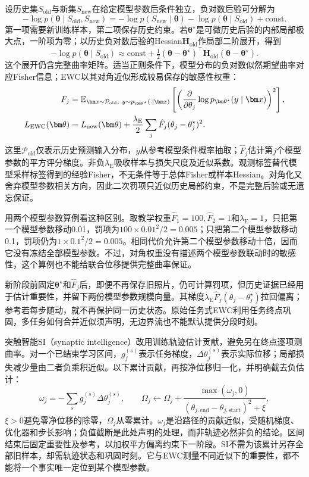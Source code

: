 设历史集$S_{\mathrm{old}}$与新集$S_{\mathrm{new}}$在给定模型参数后条件独立，负对数后验可分解为
\[
-\log p(\bm\theta\mid S_{\mathrm{old}},S_{\mathrm{new}})
=-\log p(S_{\mathrm{new}}\mid\bm\theta)
-\log p(\bm\theta\mid S_{\mathrm{old}})+\mathrm{const}.
\]
第一项需要新训练样本，第二项保存历史约束。若$\bm\theta^\star$是可微历史后验的内部局部极大点，一阶项为零；以历史负对数后验的Hessian$\bm H_{\mathrm{old}}$作局部二阶展开，得到
\[
-\log p(\bm\theta\mid S_{\mathrm{old}})
\approx\mathrm{const}
+\tfrac12(\bm\theta-\bm\theta^\star)^\top
\bm H_{\mathrm{old}}(\bm\theta-\bm\theta^\star).
\]
这个展开仍含完整曲率矩阵。适当正则条件下，模型分布的负对数似然期望曲率对应Fisher信息；EWC以其对角近似形成较易保存的敏感性权重：
\begin{align}
F_j&=\mathbb E_{\bm x\sim\mathcal P_{\mathrm{old}},\
y\sim p_{\bm\theta^\star}(\cdot\mid\bm x)}
\left[
\left(\frac{\partial}{\partial\theta_j}
\log p_{\bm\theta^\star}(y\mid\bm x)\right)^2
\right],\notag\\
L_{\mathrm{EWC}}(\bm\theta)
&=L_{\mathrm{new}}(\bm\theta)
+\frac{\lambda_{\mathrm E}}2
\sum_j\hat F_j(\theta_j-\theta_j^\star)^2.
\label{eq:ket-update-ewc}
\end{align}
这里$\mathcal P_{\mathrm{old}}$仅表示历史预测输入分布，$y$从参考模型条件概率抽取；$\hat F_j$估计第$j$个模型参数的平方评分梯度。非负$\lambda_{\mathrm E}$吸收样本与损失尺度及近似系数。观测标签替代模型采样标签得到的经验Fisher，不无条件等于总体Fisher或样本Hessian。对角化又舍弃模型参数相关方向，因此二次罚项只近似历史局部约束，不是完整后验或无遗忘保证。

用两个模型参数算例看这种区别。取教学权重$\hat F_1=100,\hat F_2=1$和$\lambda_{\mathrm E}=1$，只把第一个模型参数移动0.01，罚项为$100\times0.01^2/2=0.005$；只把第二个模型参数移动0.1，罚项仍为$1\times0.1^2/2=0.005$。相同代价允许第二个模型参数移动十倍，因而它没有冻结全部模型参数。不过，对角权重没有描述两个模型参数联动时的敏感性，这个算例也不能给联合位移提供完整曲率保证。

新阶段前固定$\bm\theta^\star$和$\hat F_j$后，即便不再保存旧照片，仍可计算罚项，但历史证据已经用于估计重要性，并留下两份模型参数规模向量。其梯度$\lambda_{\mathrm E}\hat F_j(\theta_j-\theta_j^\star)$拉回偏离；参考若每步随动，就不再保护同一历史状态。原始任务式EWC利用任务终点巩固，多任务如何合并近似须声明，无边界流也不能默认提供分段时刻。

突触智能SI（synaptic intelligence）改用训练轨迹估计贡献，避免另在终点逐项测曲率。对一个已结束学习区间，$g_j^{(s)}$表示任务梯度，$\Delta\theta_j^{(s)}$表示实际位移；局部损失减少量由二者负乘积近似。以下累计贡献，再按净位移归一化，并明确截去负估计：
\[
\omega_j=-\sum_s g_j^{(s)}\Delta\theta_j^{(s)},\qquad
\Omega_j\leftarrow\Omega_j+
\frac{\max(\omega_j,0)}{(\theta_{j,\mathrm{end}}-\theta_{j,\mathrm{start}})^2+\xi},
\]
$\xi>0$避免零净位移的除零，$\Omega_j$从零累计。$\omega_j$是沿路径的贡献近似，受随机梯度、优化器和步长影响；负值截断是此处声明的处理，而非轨迹必然非负的结论。区间结束后固定重要性及参考，以加权平方偏离约束下一阶段。SI不需为该累计另存全部旧样本，却需轨迹状态和巩固时刻。它与EWC测量不同近似下的重要性，都不能将一个事实唯一定位到某个模型参数。

